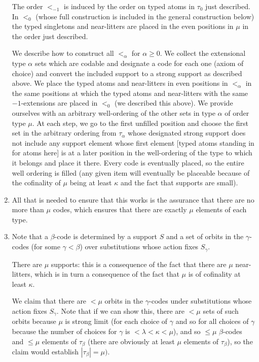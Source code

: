 \documentclass[12pt]{article}
\begin{document}
\begin{enumerate}
The order $<_{-1}$
is induced by the order on typed atoms in $\tau_0$ just described.  In $<_0$ (whose full construction is included in the general construction below) the typed singletons and near-litters are placed in the even positions in $\mu$ in the order just described.

We describe how to construct all $<_\alpha$ for $\alpha\geq 0$.  We collect the extensional type $\alpha$ sets which are codable and designate a code for each one (axiom of choice) and convert the included support to a strong support as described above. We place the typed atoms and near-litters in even positions in $<_\alpha$ in the same positions at which the typed atoms and near-litters with the same $-1$-extensions are placed in
$<_0$ (we described this above).  We provide ourselves with an arbitrary well-ordering of the other sets in type $\alpha$ of order type $\mu$.  At each step, we go to the first unfilled position and choose the first set in the arbitrary ordering from $\tau_\alpha$ whose designated strong support does not include any support element whose first element [typed atoms standing in for atoms here]  is at a later position in the well-ordering of the type to which it belongs and place it there.  Every code is eventually placed, so the entire well ordering is filled (any given item will eventually be placeable because of the cofinality of $\mu$ being at least $\kappa$ and the fact that supports are small).

\item All that is needed to ensure that this works is the assurance that there are no more than $\mu$ codes, which ensures that there are exactly $\mu$ elements of each type.

\item  Note that a $\beta$-code is determined by a support $S$ and a set of orbits in the $\gamma$-codes (for some $\gamma<\beta$) over substitutions whose action fixes $S_\gamma$.

There are $\mu$ supports:  this is a consequence of the fact that there are $\mu$ near-litters, which is in turn a consequence of the fact that $\mu$ is of cofinality at least $\kappa$.

We claim that there are $<\mu$ orbits in the $\gamma$-codes under substitutions whose action fixes $S_\gamma$.  Note that if we can show this, there are $<\mu$ sets of such orbits because $\mu$ is strong limit  (for each choice of $\gamma$ and so for all choices of $\gamma$ because the number of choices for $\gamma$ is $<\lambda<\kappa<\mu$), and so $\leq \mu$ $\beta$-codes and $\leq \mu$ elements of $\tau_\beta$ (there are obviously at least $\mu$ elements
of $\tau_\beta$), so the claim would establish $|\tau_\beta| = \mu)$.


\end{enumerate}
\end{document}
